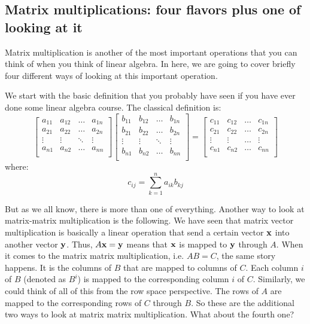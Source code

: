 \documentclass[computationalMathematics.tex]{subfiles}
\begin{document}
\subsection{Matrix multiplications: four flavors plus one of looking at it}
\par Matrix multiplication is another of the most important operations that you can think of when you think of linear algebra. In here, we are going to cover briefly four different ways of looking at this important operation.
\par We start with the basic definition that you probably have seen if you have ever done some linear algebra course. The classical definition is:
\[
    \begin{bmatrix}
        a_{11} & a_{12} & \dots & a_{1n} \\
        a_{21} & a_{22} & \dots & a_{2n} \\
        \vdots & \vdots & \ddots & \vdots \\
        a_{n1} & a_{n2} & \dots & a_{nn} \\
    \end{bmatrix}
    \begin{bmatrix}
        b_{11} & b_{12} & \dots & b_{1n} \\
        b_{21} & b_{22} & \dots & b_{2n} \\
        \vdots & \vdots & \ddots & \vdots \\
        b_{n1} & b_{n2} & \dots & b_{nn} \\
    \end{bmatrix}
    =
    \begin{bmatrix}
        c_{11} & c_{12} & \dots & c_{1n} \\
        c_{21} & c_{22} & \dots & c_{2n} \\
        \vdots & \vdots & \dots & \vdots \\
        c_{n1} & c_{n2} & \dots & c_{nn} \\
    \end{bmatrix}
\]
where:
\[
    c_{ij} = \sum_{k=1}^n a_{ik} b_{kj}
\]
\par But as we all know, there is more than one of everything. Another way to look at matrix-matrix multiplication is the following. We have seen that matrix vector multiplication is basically a linear operation that send a certain vector ${\bf x }$ into another vector ${\bf y }$. Thus, $A {\bf x } = {\bf y }$ means that ${\bf x }$ is mapped to ${\bf y }$ through $A$. When it comes to the matrix matrix multiplication, i.e. $A B = C$, the same story happens. It is the columns of $B$ that are mapped to columns of $C$. Each column $i$ of $B$ (denoted as $B^i$) is mapped to the corresponding column $i$ of $C$. Similarly, we could think of all of this from the row space perspective. The rows of $A$ are mapped to the corresponding rows of $C$ through $B$. So these are the additional two ways to look at matrix matrix multiplication. What about the fourth one?
\end{document}
